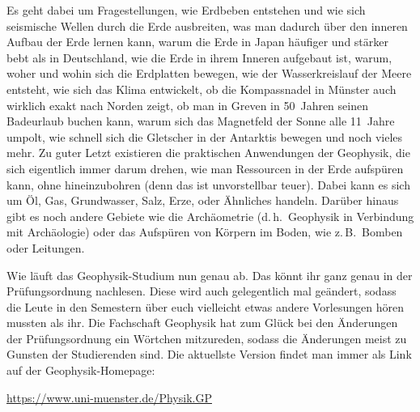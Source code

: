 \begin{multicols}{2}
Es geht dabei um Fragestellungen, wie Erdbeben entstehen und wie sich seismische Wellen durch die Erde ausbreiten, was man dadurch über den inneren Aufbau der Erde lernen kann, warum die Erde in Japan häufiger und stärker bebt als in Deutschland, wie die Erde in ihrem Inneren aufgebaut ist, warum, woher und wohin sich die Erdplatten bewegen, wie der Wasserkreislauf der Meere entsteht, wie sich das Klima entwickelt, ob die Kompassnadel in Münster auch wirklich exakt nach Norden zeigt, ob man in Greven in 50~Jahren seinen Badeurlaub buchen kann, warum sich das Magnetfeld der Sonne alle 11~Jahre umpolt, wie schnell sich die Gletscher in der Antarktis bewegen und noch vieles mehr.
Zu guter Letzt existieren die praktischen Anwendungen der Geophysik, die sich eigentlich immer darum drehen, wie man Ressourcen in der Erde aufspüren kann, ohne hineinzubohren (denn das ist unvorstellbar teuer).
Dabei kann es sich um Öl, Gas, Grundwasser, Salz, Erze, oder Ähnliches handeln.
Darüber hinaus gibt es noch andere Gebiete wie die Archäometrie (d.\,h.\ Geophysik in Verbindung mit Archäologie) oder das Aufspüren von Körpern im Boden, wie z.\,B.\ Bomben oder Leitungen.

Wie läuft das Geophysik-Studium nun genau ab.
Das könnt ihr ganz genau in der Prüfungsordnung nachlesen.
Diese wird auch gelegentlich mal geändert, sodass die Leute in den Semestern über euch vielleicht etwas andere Vorlesungen hören mussten als ihr.
Die Fachschaft Geophysik hat zum Glück bei den Änderungen der Prüfungsordnung ein Wörtchen mitzureden, sodass die Änderungen meist zu Gunsten der Studierenden sind.
Die aktuellste Version findet man immer als Link auf der Geophysik-Homepage:
\begin{center}
	\url{https://www.uni-muenster.de/Physik.GP}
\end{center}


\end{multicols}
